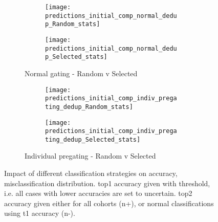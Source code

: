 \documentclass[11pt,a4paper]{article}
\begin{document}
\begin{figure}
   \centering
   \begin{subfigure}{\textwidth}
      \begin{subfigure}{0.5\columnwidth}
         \texttt{[image: predictions\_initial\_comp\_normal\_dedup\_Random\_stats]}
      \end{subfigure}
      \begin{subfigure}{0.5\columnwidth}
         \texttt{[image: predictions\_initial\_comp\_normal\_dedup\_Selected\_stats]}
      \end{subfigure}
      \caption{Normal gating - Random v Selected}
   \end{subfigure}

   \begin{subfigure}{\textwidth}
      \begin{subfigure}{0.5\columnwidth}
         \texttt{[image: predictions\_initial\_comp\_indiv\_pregating\_dedup\_Random\_stats]}
      \end{subfigure}
      \begin{subfigure}{0.5\columnwidth}
         \texttt{[image: predictions\_initial\_comp\_indiv\_pregating\_dedup\_Selected\_stats]}
      \end{subfigure}
      \caption{Individual pregating - Random v Selected}
   \end{subfigure}

   \caption{Impact of different classification strategies on accuracy, misclassification distribution. top1 accuracy given with threshold, i.e. all cases with lower accuracies are set to uncertain. top2 accuracy given either for all cohorts (n+), or normal classifications using t1 accuracy (n-).}
\end{figure}
\end{document}
